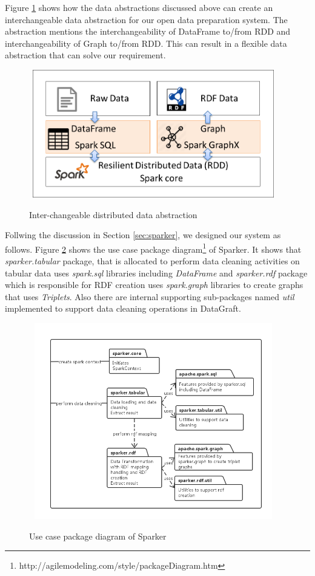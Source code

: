Figure \ref{fig:dataabstraction} shows how the data abstractions discussed above can create an interchangeable data abstraction for our open data preparation system. The abstraction mentions the interchangeability of DataFrame to/from RDD and interchangeability of Graph to/from RDD. This can result in a flexible data abstraction that can solve our requirement.
\begin{center}
	\includegraphics[width=35em, height=15em]{./Figures/data-abstraction-prog-model}
	\begin{figure}[htbp]
    \caption{Inter-changeable distributed data abstraction}
    \label{fig:dataabstraction}
	\end{figure}
\end{center}
Follwing the discussion in Section \ref{sec:sparker}, we designed our system as follows. Figure \ref{fig:package-diagram} shows the use case package diagram\footnote{http://agilemodeling.com/style/packageDiagram.htm} of Sparker. It shows that \textit{sparker.tabular} package, that is allocated to perform data cleaning activities on tabular data uses \textit{spark.sql} libraries including \textit{DataFrame} and \textit{sparker.rdf} package which is responsible for RDF creation uses  \textit{spark.graph} libraries to create graphs that uses \textit{Triplets}. Also there are internal supporting sub-packages named \textit{util} implemented to support data cleaning operations in DataGraft.
\begin{center}
	\includegraphics[width=35em, height=23em]{./Figures/Class_Diagram}
	\begin{figure}[htbp]
    \caption{Use case package diagram of Sparker}
    \label{fig:package-diagram}
	\end{figure}
\end{center}
